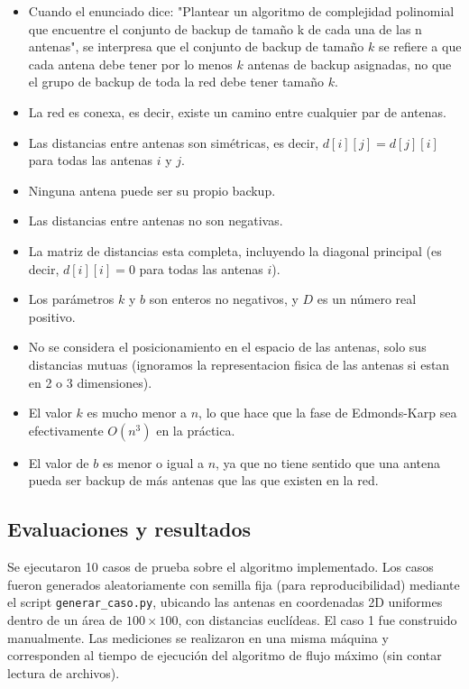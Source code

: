 \begin{itemize}
    \item Cuando el enunciado dice: "Plantear un algoritmo de complejidad polinomial que encuentre el conjunto de backup de tamaño k de cada una de las n antenas", se interpresa que el conjunto de backup de tamaño $k$ se refiere a que cada antena debe tener por lo menos $k$ antenas de backup asignadas, no que el grupo de backup de toda la red debe tener tamaño $k$.
    \item La red es conexa, es decir, existe un camino entre cualquier par de antenas.
    \item Las distancias entre antenas son simétricas, es decir, $d[i][j] = d[j][i]$ para todas las antenas $i$ y $j$.
    \item Ninguna antena puede ser su propio backup.
    \item Las distancias entre antenas no son negativas. 
    \item La matriz de distancias esta completa, incluyendo la diagonal principal (es decir, $d[i][i] = 0$ para todas las antenas $i$).
    \item Los parámetros $k$ y $b$ son enteros no negativos, y $D$ es un número real positivo.
    \item No se considera el posicionamiento en el espacio de las antenas, solo sus distancias mutuas (ignoramos la representacion fisica de las antenas si estan en 2 o 3 dimensiones).
    \item El valor $k$ es mucho menor a $n$, lo que hace que la fase de Edmonds-Karp sea efectivamente $O(n^3)$ en la práctica.
    \item El valor de $b$ es menor o igual a $n$, ya que no tiene sentido que una antena pueda ser backup de más antenas que las que existen en la red.
\end{itemize}

\subsection{Evaluaciones y resultados}

Se ejecutaron 10 casos de prueba sobre el algoritmo implementado. Los casos fueron generados aleatoriamente con semilla fija (para reproducibilidad) mediante el script \texttt{generar\_caso.py}, ubicando las antenas en coordenadas 2D uniformes dentro de un área de $100 \times 100$, con distancias euclídeas. El caso 1 fue construido manualmente. Las mediciones se realizaron en una misma máquina y corresponden al tiempo de ejecución del algoritmo de flujo máximo (sin contar lectura de archivos).

